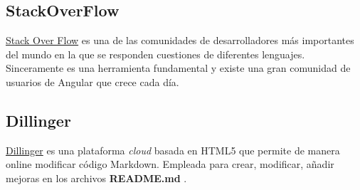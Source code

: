  \subsection{StackOverFlow}\label{otrasherramientas_dillinger}

\href{https://stackoverflow.com/}{Stack Over Flow} es una de las comunidades de desarrolladores más importantes del mundo \cite{articulo2} en la que se responden cuestiones de diferentes lenguajes. Sinceramente es una herramienta fundamental y existe una gran comunidad de usuarios de Angular que crece cada día.


   \subsection{Dillinger}\label{otrasherramientas_dillinger}
    \href{https://www.zenhub.io/}{Dillinger} es una plataforma \emph{cloud}  basada en HTML5  que permite de manera online modificar código Markdown. Empleada para crear, modificar, añadir mejoras en los archivos \textbf{README.md} .
     
     




